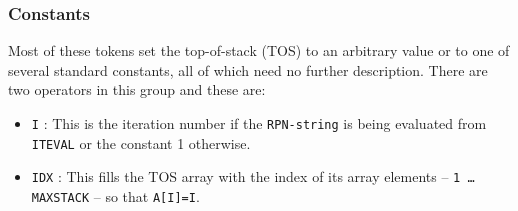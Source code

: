 \documentclass[a4paper,twoside,11pt]{article}
\newcommand{\newpara}{\par\vspace{4mm}\noindent}
\begin{document}
\subsubsection{Constants}
Most of these tokens set the top-of-stack (TOS) to an arbitrary value or to one of several standard constants, all of which need no further
description. There are two operators in this group and these are:
\begin{itemize}
\item \texttt{I} : This is the iteration number if the \texttt{RPN-string} is being evaluated from \texttt{ITEVAL} or the constant 1 otherwise.
\item \texttt{IDX} : This fills the TOS array with the index of its array elements -- \texttt{1 \ldots MAXSTACK} -- so that \texttt{A[I]=I}. 
\end{itemize}
\newpara
{}
\end{document}
